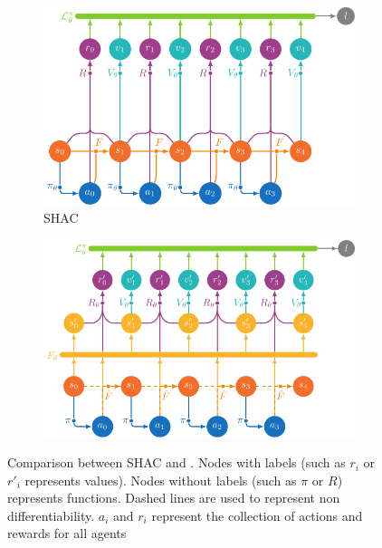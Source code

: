 \begin{figure}[t]
    \centering
    \begin{subfigure}[b]{0.45\textwidth}
        \includegraphics[width=\textwidth]{figs/shac.pdf}
        \caption{SHAC}
        \label{fig:shac}
    \end{subfigure}
    \begin{subfigure}[b]{0.45\textwidth}
        \includegraphics[width=\textwidth]{figs/shacpp.pdf}
        \caption{\fname{}}
        \label{fig:shacpp}
    \end{subfigure}
    \caption{Comparison between SHAC and \fname{}. Nodes with labels (such as $r_i$ or $r'_i$ represents values). Nodes without labels (such as $\pi$ or $R$) represents functions. Dashed lines are used to represent non differentiability. $a_i$ and $r_i$ represent the collection of actions and rewards for all agents}\label{fig:shac-shacpp}
\end{figure}


